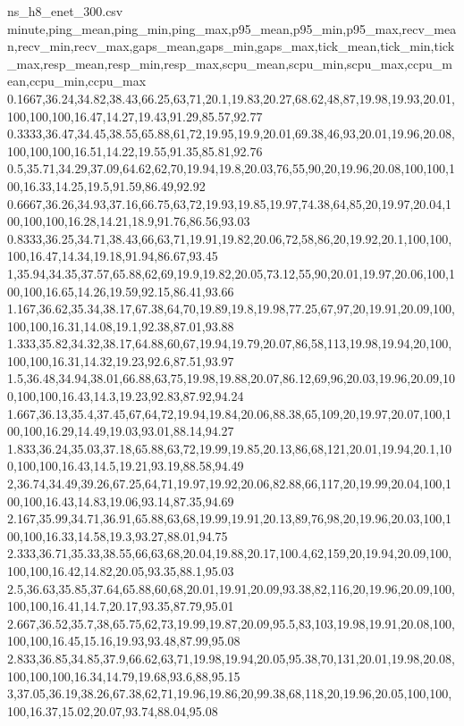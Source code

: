 \begin{filecontents*}[overwrite]{ns_h8_enet_300.csv}
minute,ping_mean,ping_min,ping_max,p95_mean,p95_min,p95_max,recv_mean,recv_min,recv_max,gaps_mean,gaps_min,gaps_max,tick_mean,tick_min,tick_max,resp_mean,resp_min,resp_max,scpu_mean,scpu_min,scpu_max,ccpu_mean,ccpu_min,ccpu_max
0.1667,36.24,34.82,38.43,66.25,63,71,20.1,19.83,20.27,68.62,48,87,19.98,19.93,20.01,100,100,100,16.47,14.27,19.43,91.29,85.57,92.77
0.3333,36.47,34.45,38.55,65.88,61,72,19.95,19.9,20.01,69.38,46,93,20.01,19.96,20.08,100,100,100,16.51,14.22,19.55,91.35,85.81,92.76
0.5,35.71,34.29,37.09,64.62,62,70,19.94,19.8,20.03,76,55,90,20,19.96,20.08,100,100,100,16.33,14.25,19.5,91.59,86.49,92.92
0.6667,36.26,34.93,37.16,66.75,63,72,19.93,19.85,19.97,74.38,64,85,20,19.97,20.04,100,100,100,16.28,14.21,18.9,91.76,86.56,93.03
0.8333,36.25,34.71,38.43,66,63,71,19.91,19.82,20.06,72,58,86,20,19.92,20.1,100,100,100,16.47,14.34,19.18,91.94,86.67,93.45
1,35.94,34.35,37.57,65.88,62,69,19.9,19.82,20.05,73.12,55,90,20.01,19.97,20.06,100,100,100,16.65,14.26,19.59,92.15,86.41,93.66
1.167,36.62,35.34,38.17,67.38,64,70,19.89,19.8,19.98,77.25,67,97,20,19.91,20.09,100,100,100,16.31,14.08,19.1,92.38,87.01,93.88
1.333,35.82,34.32,38.17,64.88,60,67,19.94,19.79,20.07,86,58,113,19.98,19.94,20,100,100,100,16.31,14.32,19.23,92.6,87.51,93.97
1.5,36.48,34.94,38.01,66.88,63,75,19.98,19.88,20.07,86.12,69,96,20.03,19.96,20.09,100,100,100,16.43,14.3,19.23,92.83,87.92,94.24
1.667,36.13,35.4,37.45,67,64,72,19.94,19.84,20.06,88.38,65,109,20,19.97,20.07,100,100,100,16.29,14.49,19.03,93.01,88.14,94.27
1.833,36.24,35.03,37.18,65.88,63,72,19.99,19.85,20.13,86,68,121,20.01,19.94,20.1,100,100,100,16.43,14.5,19.21,93.19,88.58,94.49
2,36.74,34.49,39.26,67.25,64,71,19.97,19.92,20.06,82.88,66,117,20,19.99,20.04,100,100,100,16.43,14.83,19.06,93.14,87.35,94.69
2.167,35.99,34.71,36.91,65.88,63,68,19.99,19.91,20.13,89,76,98,20,19.96,20.03,100,100,100,16.33,14.58,19.3,93.27,88.01,94.75
2.333,36.71,35.33,38.55,66,63,68,20.04,19.88,20.17,100.4,62,159,20,19.94,20.09,100,100,100,16.42,14.82,20.05,93.35,88.1,95.03
2.5,36.63,35.85,37.64,65.88,60,68,20.01,19.91,20.09,93.38,82,116,20,19.96,20.09,100,100,100,16.41,14.7,20.17,93.35,87.79,95.01
2.667,36.52,35.7,38,65.75,62,73,19.99,19.87,20.09,95.5,83,103,19.98,19.91,20.08,100,100,100,16.45,15.16,19.93,93.48,87.99,95.08
2.833,36.85,34.85,37.9,66.62,63,71,19.98,19.94,20.05,95.38,70,131,20.01,19.98,20.08,100,100,100,16.34,14.79,19.68,93.6,88,95.15
3,37.05,36.19,38.26,67.38,62,71,19.96,19.86,20,99.38,68,118,20,19.96,20.05,100,100,100,16.37,15.02,20.07,93.74,88.04,95.08

\end{filecontents*}
